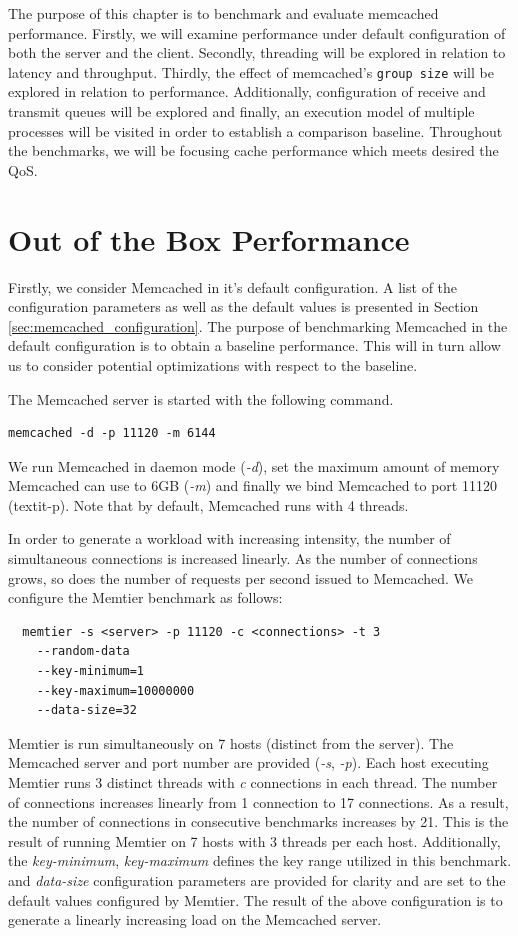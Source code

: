 The purpose of this chapter is to benchmark and evaluate memcached performance. Firstly, we will examine performance under default configuration of both the server and the client. Secondly, threading will be explored in relation to latency and throughput. Thirdly, the effect of memcached's \texttt{group size} will be explored in relation to performance. Additionally, configuration of receive and transmit queues will be explored and finally, an execution model of multiple processes will be visited in order to establish a comparison baseline. Throughout the benchmarks, we will be focusing cache performance which meets desired the QoS.


\section{Out of the Box Performance}

Firstly, we consider Memcached in it's default configuration. A list of the configuration parameters as well as the default values is presented in Section \ref{sec:memcached_configuration}. The purpose of benchmarking Memcached in the default configuration is to obtain a baseline performance. This will in turn allow us to consider potential optimizations with respect to the baseline.

The Memcached server is started with the following command.

\begin{lstlisting}
memcached -d -p 11120 -m 6144
\end{lstlisting}

We run Memcached in daemon mode (\textit{-d}), set the maximum amount of memory Memcached can use to 6GB (\textit{-m}) and finally we bind Memcached to port 11120 (textit{-p}). Note that by default, Memcached runs with 4 threads.


In order to generate a workload with increasing intensity, the number of simultaneous connections is increased linearly. As the number of connections grows, so does the number of requests per second issued to Memcached. We configure the Memtier benchmark as follows:

\begin{lstlisting}
  memtier -s <server> -p 11120 -c <connections> -t 3
    --random-data
    --key-minimum=1
    --key-maximum=10000000
    --data-size=32
\end{lstlisting}
Memtier is run simultaneously on 7 hosts (distinct from the server). The Memcached server and port number are provided (\textit{-s}, \textit{-p}). Each host executing Memtier runs 3 distinct threads with \textit{c} connections in each thread. The number of connections increases linearly from 1 connection to 17 connections. As a result, the number of connections in consecutive benchmarks increases by 21. This is the result of running Memtier on 7 hosts with 3 threads per each host. Additionally, the \textit{key-minimum}, \textit{key-maximum} defines the key range utilized in this benchmark. and \textit{data-size} configuration parameters are provided for clarity and are set to the default values configured by Memtier. The result of the above configuration is to generate a linearly increasing load on the Memcached server.


